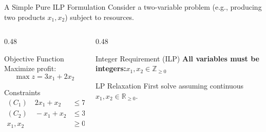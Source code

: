 \documentclass[aspectratio=169]{beamer}
\begin{document}
\begin{frame}{A Simple Pure ILP Formulation}
  Consider a two-variable problem (e.g., producing two products $x_1,x_2$) subject to resources.
  \vspace{-0.3em}
  \begin{columns}[T]
    \begin{column}{0.48\textwidth}
      \begin{block}{Objective Function}
        Maximize profit:
        \[
          \max z = 3x_1 + 2x_2
        \]
      \end{block}
      \begin{block}{Constraints}
        \begin{align*}
          (C_1)\quad 2x_1 + x_2 &\le 7 \\
          (C_2)\quad -x_1 + x_2 &\le 3 \\
          x_1, x_2 &\ge 0
        \end{align*}
      \end{block}
    \end{column}
    \begin{column}{0.48\textwidth}
      \begin{block}{Integer Requirement (ILP)}
        \centering
        \textbf{All variables must be integers:}\quad $x_1, x_2 \in \mathbb{Z}_{\ge 0}$
      \end{block}
      \begin{block}{LP Relaxation}
        \centering
        First solve assuming continuous $x_1, x_2 \in \mathbb{R}_{\ge 0}$.
      \end{block}
    \end{column}
  \end{columns}
\end{frame}
\end{document}
